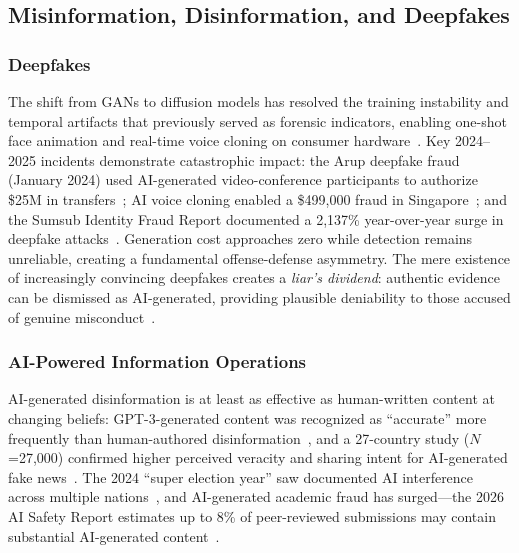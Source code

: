 \subsection{Misinformation, Disinformation, and Deepfakes}
\label{sec:threat-misinfo}

\subsubsection{Deepfakes}
\label{sec:threat-deepfake}

The shift from GANs to diffusion models has resolved the training instability and temporal artifacts that previously served as forensic indicators, enabling one-shot face animation and real-time voice cloning on consumer hardware~\cite{pei2024deepfakesurvey}. Key 2024--2025 incidents demonstrate catastrophic impact: the Arup deepfake fraud (January 2024) used AI-generated video-conference participants to authorize \$25M in transfers~\cite{wef2025arup}; AI voice cloning enabled a \$499,000 fraud in Singapore~\cite{brightside2025phishing}; and the Sumsub Identity Fraud Report documented a 2,137\% year-over-year surge in deepfake attacks~\cite{sumsub2024}. Generation cost approaches zero while detection remains unreliable, creating a fundamental offense-defense asymmetry. The mere existence of increasingly convincing deepfakes creates a \emph{liar's dividend}: authentic evidence can be dismissed as AI-generated, providing plausible deniability to those accused of genuine misconduct~\cite{chesney2019deepfakes}.


\subsubsection{AI-Powered Information Operations}
\label{sec:threat-infoop}

AI-generated disinformation is at least as effective as human-written content at changing beliefs: GPT-3-generated content was recognized as ``accurate'' more frequently than human-authored disinformation~\cite{spitale2023gpt3}, and a 27-country study ($N$=27,000) confirmed higher perceived veracity and sharing intent for AI-generated fake news~\cite{stefkovics2026fakenews}. The 2024 ``super election year'' saw documented AI interference across multiple nations~\cite{restofworld2024tracker}, and AI-generated academic fraud has surged---the 2026 AI Safety Report estimates up to 8\% of peer-reviewed submissions may contain substantial AI-generated content~\cite{aisafetyreport2026}.



